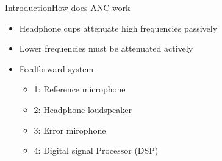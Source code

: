 \begin{frame}{Introduction}{How does ANC work}		
	\begin{itemize}
		\item Headphone cups attenuate high frequencies passively
		\item Lower frequencies must be attenuated actively 
		\item Feedforward system
		\begin{itemize}
			\item 1: Reference microphone
			\item 2: Headphone loudspeaker
			\item 3: Error mirophone
			\item 4: Digital signal Processor (DSP)
		\end{itemize}
	\end{itemize}
	\begin{center}
	 	
	\end{center}
\end{frame}



